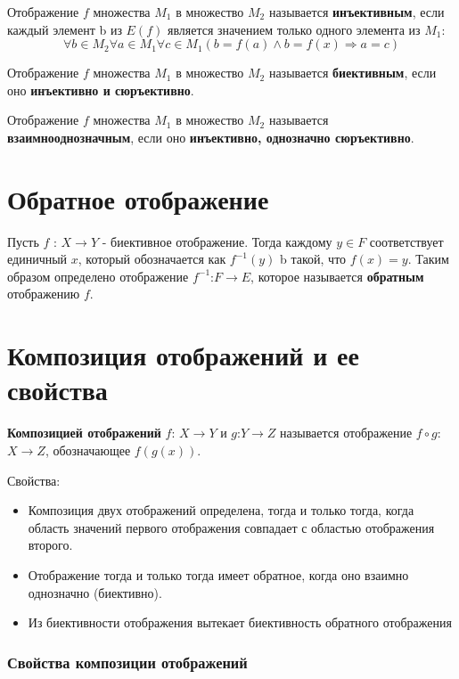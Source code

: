 \documentclass[a4paper]{article}
\begin{document}
Отображение $f$ множества $M_1$ в множество $M_2$ называется
\textbf{инъективным}, если каждый элемент b из $E(f)$ является значением только одного элемента из $M_1$:
\begin{equation}
\forall b \in M_2 \forall a \in M_1 \forall c \in M_1 (b = f(a) \land b = f(x) \Rightarrow a = c)
\end{equation}

Отображение $f$ множества $M_1$ в множество $M_2$ называется
\textbf{биективным}, если оно \textbf{инъективно и сюръективно}. 

Отображение $f$ множества $M_1$ в множество $M_2$ называется
\textbf{взаимнооднозначным}, если оно \textbf{инъективно, однозначно сюръективно}.

\section*{Обратное отображение
}
Пусть $f$ : $X \rightarrow Y$ - биективное отображение. Тогда каждому $y \in F$ соответствует единичный $x$, который обозначается как $f^{-1} (y)$ b такой, что $f(x) = y$. Таким образом определено отображение $f^{-1}$:$F \rightarrow E$, которое называется \textbf{обратным} отображению $f$.

\section*{Композиция отображений и ее свойства}
\textbf{Композицией отображений} $f$: $X \rightarrow Y$ и $g$:$Y \rightarrow Z$ называется отображение $f \circ g$: $X \rightarrow Z$, обозначающее $f(g(x))$.

Свойства:
\begin{itemize}
\item Композиция двух отображений определена, тогда и только тогда, когда область значений первого отображения совпадает с областью отображения второго.
\item Отображение тогда и только тогда
имеет обратное, когда оно взаимно однозначно (биективно).
\item Из биективности отображения вытекает биективность обратного отображения
\end{itemize}


\subsubsection*{Свойства композиции отображений}
\end{document}
